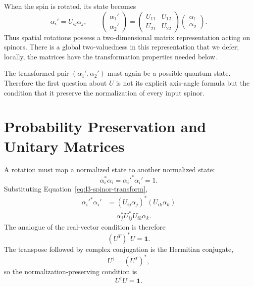 When the spin is rotated, its state becomes
\begin{equation}
\alpha_i'=U_{ij}\alpha_j,
\qquad
\begin{pmatrix}\alpha_1'\\\alpha_2'\end{pmatrix}
=
\begin{pmatrix}
U_{11}&U_{12}\\
U_{21}&U_{22}
\end{pmatrix}
\begin{pmatrix}\alpha_1\\\alpha_2\end{pmatrix}.
\label{eq:l3-spinor-transform}
\end{equation}
Thus spatial rotations possess a two-dimensional matrix representation acting
on spinors. There is a global two-valuedness in this representation that we
defer; locally, the matrices have the transformation properties needed below.

The transformed pair \((\alpha_1',\alpha_2')\) must again be a possible
quantum state. Therefore the first question about \(U\) is not its explicit
axis-angle formula but the condition that it preserve the normalization of
every input spinor.

\section{Probability Preservation and Unitary Matrices}

A rotation must map a normalized state to another normalized state:
\begin{equation}
\alpha_i^*\alpha_i=\alpha_i'^*\alpha_i'=1.
\end{equation}
Substituting Equation~\eqref{eq:l3-spinor-transform},
\begin{align}
\alpha_i'^*\alpha_i'
 &=(U_{ij}\alpha_j)^*(U_{ik}\alpha_k)\\
 &=\alpha_j^*U_{ij}^*U_{ik}\alpha_k.
\end{align}
The analogue of the real-vector condition is therefore
\begin{equation}
(U^T)^*U=\boldsymbol 1.
\end{equation}
The transpose followed by complex conjugation is the Hermitian conjugate,
\begin{equation}
U^\dagger=(U^T)^*,
\end{equation}
so the normalization-preserving condition is
\begin{equation}
U^\dagger U=\boldsymbol 1.
\label{eq:l3-unitarity}
\end{equation}

